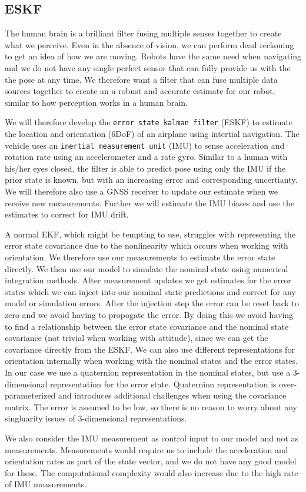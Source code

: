 \subsection{ESKF}
The human brain is a brilliant filter fusing multiple senses together to create what we perceive. Even in the absence of vision, we can perform dead reckoning to get an idea of how we are moving.
Robots have the same need when navigating and we do not have any single perfect sensor that can fully provide us with the the pose at any time. We therefore want a filter that can fuse multiple data sources together to create an a robust and accurate estimate for our robot, similar to how perception works in a human brain.

We will therefore develop the \texttt{error state kalman filter} (ESKF) to estimate the location and orientation (6DoF) of an airplane using intertial navigation. The vehicle uses an \texttt{inertial measurement unit} (IMU) to sense acceleration and rotation rate using an accelerometer and a rate gyro. Similar to a human with his/her eyes closed, the filter is able to predict pose using only the IMU if the prior state is known, but with an increasing error and corresponding uncertianty. We will therefore also use a GNSS receiver to update our estimate when we receive new measurements. Further we will estimate the IMU biases and use the estimates to correct for IMU drift. 

A normal EKF, which might be tempting to use, struggles with representing the error state covariance due to the nonlinearity which occurs when working with orientation. We therefore use our measurements to estimate the error state directly. We then use our model to simulate the nominal state using numerical integration methods. After measurement updates we get estimates for the error states which we can inject into our nominal state predictions and correct for any model or simulation errors. After the injection step the error can be reset back to zero and we avoid having to propogate the error.
By doing this we avoid having to find a relationship between the error state covariance and the nominal state covariance (not trivial when working with attitude), since we can get the covariance directly from the ESKF. We can also use different representations for orientation internally when working with the nominal states and the error states. In our case we use a quaternion representation in the nominal states, but use a 3-dimensional representation for the error state. Quaternion representation is over-parameterized and introduces additional challenges when using the covariance matrix. The error is assumed to be low, so there is no reason to worry about any singluarity issues of 3-dimensional representations.

We also consider the IMU measurement as control input to our model and not as measurements. Measurements would require us to include the acceleration and orientation rates as part of the state vector, and we do not have any good model for these. The computational complexity would also increase due to the high rate of IMU measurements.
